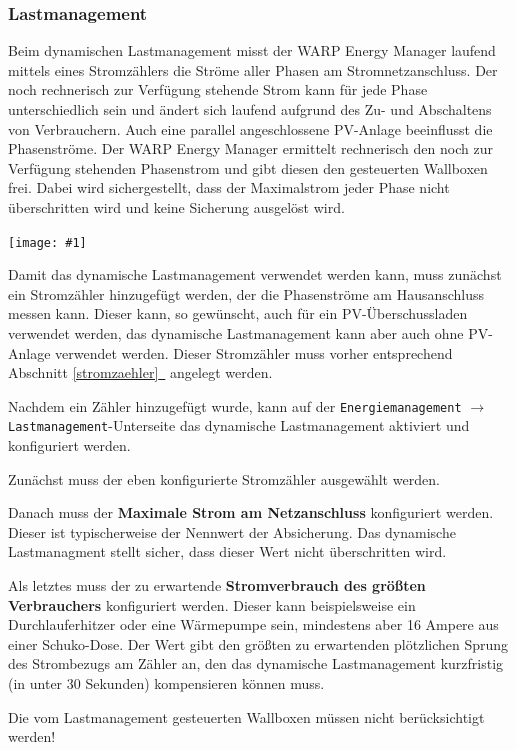\documentclass[a4paper,10pt]{article}
\newcommand{\hint}[1]{\begin{tcolorbox}[colback=boxgray,colframe=black,coltext=
white,title=Hinweis,left*=2mm,right*=2mm,boxsep=1mm,bottom=1mm,top=1mm]#1\end{tcolorbox}}
\newcommand{\gfx}[1]{\texttt{[image: \#1]}}
\newcommand*{\fullref}[1]{Abschnitt \hyperref[{#1}]{\ref*{#1}~\nameref*{#1}}}
\begin{document}
\begin{multicols*}{2}
	\subsubsection{Lastmanagement}

	Beim dynamischen Lastmanagement misst der WARP Energy Manager laufend mittels eines Stromzählers die
	Ströme aller Phasen am Stromnetzanschluss. Der noch rechnerisch zur
	Verfügung stehende Strom kann für jede Phase unterschiedlich sein und ändert
	sich laufend aufgrund des Zu- und Abschaltens von Verbrauchern. Auch eine
	parallel angeschlossene PV-Anlage beeinflusst die Phasenströme. Der WARP
	Energy Manager ermittelt rechnerisch den noch zur Verfügung stehenden
	Phasenstrom und gibt diesen den gesteuerten Wallboxen frei.
	Dabei wird sichergestellt, dass der Maximalstrom jeder Phase nicht überschritten wird und keine Sicherung ausgelöst wird.

    \gfx{./img_v2/wem2-web-load-management}

    Damit das dynamische Lastmanagement verwendet werden kann, muss zunächst ein
    Stromzähler hinzugefügt werden, der die Phasenströme am Hausanschluss messen kann.
    Dieser kann, so gewünscht, auch für ein PV-Überschussladen verwendet werden,
    das dynamische Lastmanagement kann aber auch ohne PV-Anlage verwendet werden. Dieser Stromzähler muss vorher entsprechend \fullref{stromzaehler} angelegt werden.

    Nachdem ein Zähler hinzugefügt wurde, kann auf der \texttt{Energiemanagement} $\rightarrow$ \texttt{Lastmanagement}-Unterseite das dynamische Lastmanagement aktiviert und konfiguriert werden.

    Zunächst muss der eben konfigurierte Stromzähler ausgewählt werden.

    Danach muss der \textbf{Maximale Strom am Netzanschluss} konfiguriert werden. Dieser ist typischerweise der Nennwert der Absicherung.
    Das dynamische Lastmanagment stellt sicher, dass dieser Wert nicht überschritten wird.

    Als letztes muss der zu erwartende \textbf{Stromverbrauch des größten Verbrauchers} konfiguriert werden.
    Dieser kann beispielsweise ein Durchlauferhitzer oder eine Wärmepumpe sein, mindestens aber 16 Ampere aus einer Schuko-Dose.
    Der Wert gibt den größten zu er­war­ten­den plötz­li­chen Sprung des Strom­bezugs am Zähler an, den das dy­na­mi­sche Last­manage­ment kurz­fris­tig (in unter 30 Sekunden) kom­pen­sieren können muss.

    \hint{Die vom Last­manage­ment ge­steu­er­ten Wallboxen müssen nicht be­rück­sich­tigt werden!}



\end{multicols*}
\end{document}
